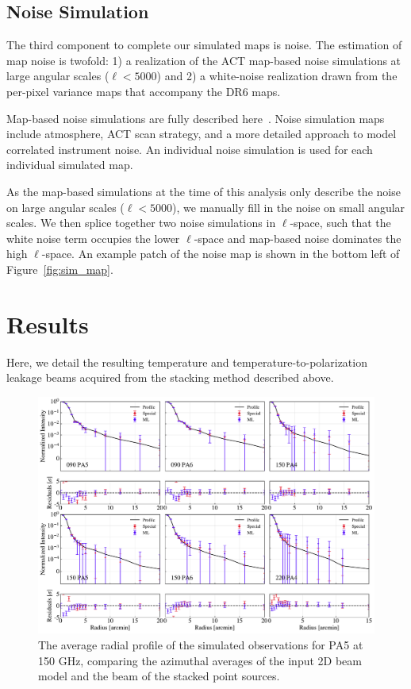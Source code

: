 \subsection{Noise Simulation}
\label{subsec:sim_noise}
The third component to complete our simulated maps is noise.  The estimation of map noise is twofold: 1) a realization of the ACT map-based noise simulations at large angular scales ($\ell<5000$) and 2) a white-noise realization drawn from the per-pixel variance maps that accompany the DR6 maps.

Map-based noise simulations are fully described here~\cite{}.  Noise simulation maps include atmosphere, ACT scan strategy, and a more detailed approach to model correlated instrument noise.  An individual noise simulation is used for each individual simulated map.

As the map-based simulations at the time of this analysis only describe the noise on large angular scales ($\ell<5000$), we manually fill in the noise on small angular scales.  We then splice together two noise simulations in $\ell$-space, such that the white noise term occupies the lower $\ell$-space and map-based noise dominates the high $\ell$-space.  An example patch of the noise map is shown in the bottom left of Figure~\ref{fig:sim_map}.

\section{Results}
\label{sec:act_results}
Here, we detail the resulting temperature and temperature-to-polarization leakage beams acquired from the stacking method described above. 

\begin{figure}[t]
    \centering
    \includegraphics[width=\textwidth]{Figures/profiles_noP_15.pdf}
    \caption{The average radial profile of the simulated observations for PA5 at 150 GHz, comparing the azimuthal averages of the input 2D beam model and the beam of the stacked point sources. 
    }
    \label{fig:profiles}
\end{figure}

